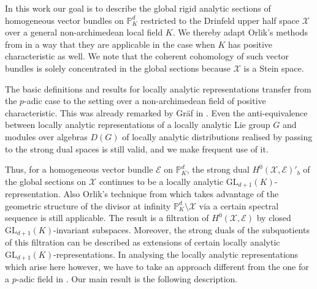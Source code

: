 \documentclass[a4paper, reqno, 10pt]{amsart}
\theoremstyle{definition}
\numberwithin{equation}{section}
\newcommand{\GL}{{\mathrm{GL}}}
\newcommand{\BP}{{\mathbb {P}}}
\newcommand{\CE}{{\mathcal {E}}}
\newcommand{\CX}{{\mathcal {X}}}
\begin{document}
In this work our goal is to describe the global rigid analytic sections of homogeneous vector bundles on $\BP_K^d$ restricted to the Drinfeld upper half space $\CX$ over a general non-archimedean local field $K$.
We thereby adapt Orlik's methods from \cite{Orlik08EquivVBDrinfeldUpHalfSp} in a way that they are applicable in the case when $K$ has positive characteristic as well.
We note that the coherent cohomology of such vector bundles is solely concentrated in the global sections because $\CX$ is a Stein space.


The basic definitions and results for locally analytic representations transfer from the $p$-adic case to the setting over a non-archimedean field of positive characteristic.
This was already remarked by Gräf in \cite{Graef21BoundDistr}.
Even the anti-equivalence between locally analytic representations of a locally analytic Lie group $G$ and modules over algebras $D(G)$ of locally analytic distributions realised by passing to the strong dual spaces is still valid, and we make frequent use of it.



Thus, for a homogeneous vector bundle $\CE$ on $\BP_K^d$, the strong dual $H^0(\CX,\CE)'_b$ of the global sections on $\CX$ continues to be a locally analytic $\GL_{d+1}(K)$-representation.
Also Orlik's technique from \cite{Orlik08EquivVBDrinfeldUpHalfSp} which takes advantage of the geometric structure of the divisor at infinity $\BP_K^d \setminus \CX$ via a certain spectral sequence is still applicable.
The result is a filtration of $H^0 (\CX,\CE)$ by closed $\GL_{d+1}(K)$-invariant subspaces.
Moreover, the strong duals of the subquotients of this filtration can be described as extensions of certain locally analytic $\GL_{d+1}(K)$-representations.
In analysing the locally analytic representations which arise here however, we have to take an approach different from the one for a $p$-adic field in \cite{Orlik08EquivVBDrinfeldUpHalfSp}.
Our main result is the following description.
\end{document}
